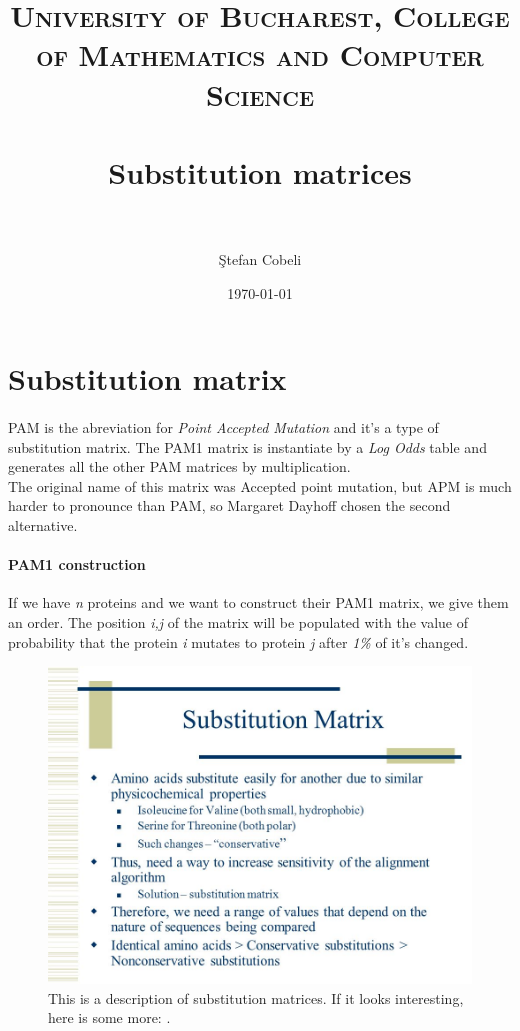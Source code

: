 \documentclass[paper=a4, fontsize=11pt]{scrartcl} %
\title{	
\normalfont \normalsize 
\textsc{University of Bucharest, College of Mathematics and Computer Science  } \\ [25pt] %
\horrule{0.5pt} \\[0.4cm] %
\huge Substitution matrices \\ %
\horrule{2pt} \\[0.5cm] %
}
\author{\c Stefan Cobeli} %
\date{\normalsize\today} %
\numberwithin{equation}{section} %
\numberwithin{figure}{section} %
\numberwithin{table}{section} %
\begin{document}
\maketitle %


\section{Substitution matrix}

\lipsum[200]  %

\paragraph{}PAM is the abreviation for \textit{Point Accepted Mutation} and it's a type of substitution matrix. The PAM1 matrix is instantiate by a \textit{ Log Odds } table and  generates all the other PAM matrices by multiplication.\\
The original name of this matrix was Accepted point mutation, but APM is much harder to pronounce than PAM, so Margaret Dayhoff chosen the second alternative.


\paragraph{PAM1 construction}
If we have \textit{n} proteins and we want to construct their PAM1 matrix, we give them an order. The position \textit{i,j} of the matrix will be populated with the value of probability that the protein \textit{i} mutates to protein \textit{j} after \textit{1\%} of it's changed.


\begin{figure}[h!]
  \includegraphics[width=\linewidth]{About_substitution_matrix1.jpg}
 	This is a description of substitution matrices. If it looks interesting, here is some more:
 	\cite{Sub1}.
  \label{fig:boat1}
\end{figure}
\newpage
\end{document}
